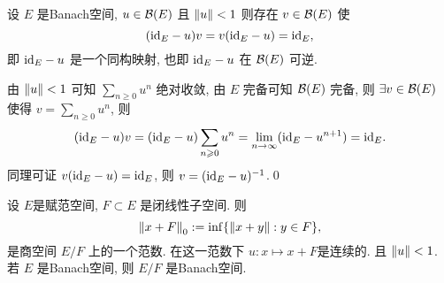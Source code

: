 	\begin{Theorem}
		 设 $ E $ 是Banach空间,  $ u\in\mathcal{B}(E) $ 且 $ \left\| u \right\|<1 $ 则存在 $ v\in\mathcal{B}(E) $ 使
		 \[
			 (\mathrm{id}_{E}-u)v=v(\mathrm{id}_{E}-u)=\mathrm{id}_{E},
		 \]
		 即 $ \mathrm{id}_{E}-u $ 是一个同构映射, 也即 $ \mathrm{id}_{E}-u $ 在 $ \mathcal{B}(E) $ 可逆.
	\end{Theorem}
	\begin{Proof}
		由 $ \left\| u \right\|<1 $ 可知 $ \sum\limits_{n\geqslant0}u^n $ 绝对收敛, 由 $ E $ 完备可知 $ \mathcal{B}
		(E) $ 完备, 则 $ \exists v\in\mathcal{B}(E) $ 使得 $ v=\sum\limits_{n\geqslant 0}u^n $, 则
		\[
			(\mathrm{id}_E-u)v=(\mathrm{id}_E-u)\sum_{n\geqslant 0}u^n=\lim_{n\to\infty}(\mathrm{id}_E-u^{n+1})=\mathrm{id}_E.
		\]
		同理可证 $ v(\mathrm{id}_E-u)=\mathrm{id}_E $, 则 $ v=(\mathrm{id}_E-u)^{-1} $.\qed
	\end{Proof}
	
	\begin{Theorem}
		设 $ E $是赋范空间, $ F\subset E $ 是闭线性子空间. 则
		\[
			\left\| x+F \right\|_0:=\inf\{ \left\| x+y \right\| : y\in F \},
		\]
		是商空间 $ E/F $ 上的一个范数. 在这一范数下 $ u : x\mapsto x+F $是连续的. 且 $ \left\| u \right\|<1 $. 若 $ E $ 是Banach空间, 则 $ E/F $ 是Banach空间.
	\end{Theorem}
